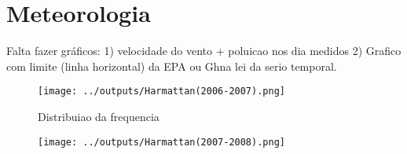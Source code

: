\chapter{Meteorologia}

Falta fazer gráficos:
1) velocidade do vento + poluicao nos dia medidos
2) Grafico com limite (linha horizontal) da EPA ou Ghna lei da serio temporal.

\begin{figure}[H]
\begin{center}
  \texttt{[image: ../outputs/Harmattan(2006-2007).png]}
\end{center}
\caption{Distribuiao da frequencia}
\end{figure}

\begin{figure}[H]
\begin{center}
  \texttt{[image: ../outputs/Harmattan(2007-2008).png]}
\end{center}
\end{figure}

\begin{figure}[H]
\begin{center}
\end{center}
\end{figure}

\begin{figure}[H]
\begin{center}
\end{center}
\end{figure}

\begin{figure}[H]
\begin{center}
\end{center}
\end{figure}

\begin{figure}[H]
\begin{center}
\end{center}
\end{figure}

\begin{figure}[H]
\begin{center}
\end{center}
\end{figure}

\begin{figure}[H]
\begin{center}
\end{center}
\end{figure}

\begin{figure}[H]
\begin{center}
\end{center}
\end{figure}
